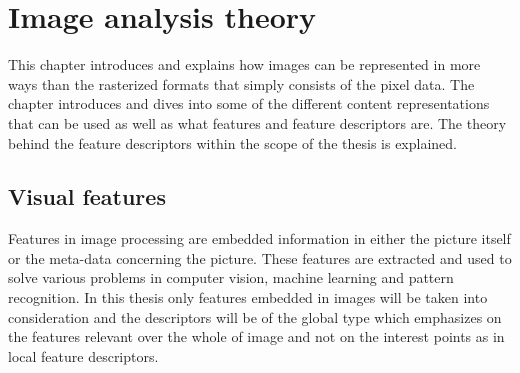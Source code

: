 \chapter{Image analysis theory}
\label{chapter:imagetheory}

This chapter introduces and explains how images can be represented in more ways than the rasterized formats that simply consists of the pixel data. The chapter introduces and dives into some of the different content representations that can be used as well as what features and feature descriptors are. The theory behind the feature descriptors within the scope of the thesis is explained. 


\section{Visual features}
\label{sec:image_features}
Features in image processing are embedded information in either the picture itself or the meta-data concerning the picture. These features are extracted and used to solve various problems in computer vision, machine learning and pattern recognition. In this thesis only features embedded in images will be taken into consideration and the descriptors will be of the global type which emphasizes on the features relevant over the whole of image and not on the interest points as in local feature descriptors. 

